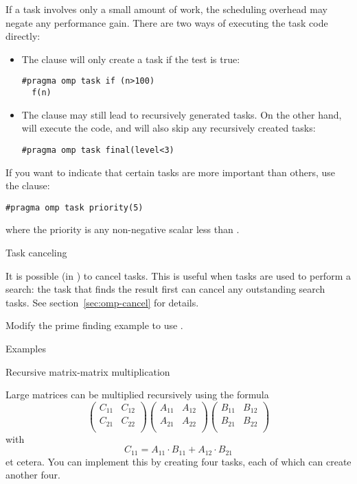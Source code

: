 If a task involves only a small amount of work,
the scheduling overhead may negate any performance gain.
There are two ways of executing the task code directly:
\begin{itemize}
\item The  clause will only create a task
  if the test is true:
\begin{lstlisting}
#pragma omp task if (n>100)
  f(n)
\end{lstlisting}
\item The  clause may still lead to recursively
  generated tasks. On the other hand, 
  will execute the code, and will also skip any recursively created tasks:
\begin{lstlisting}
#pragma omp task final(level<3)
\end{lstlisting}
\end{itemize}

If you want to indicate that certain tasks are more important
than others, use the  clause:
\begin{lstlisting}
#pragma omp task priority(5)
\end{lstlisting}
where the priority is any non-negative scalar
less than .

 {Task canceling}

It is possible (in ) to cancel
tasks. This is useful when tasks are used to perform a search: the
task that finds the result first can cancel any outstanding search
tasks.
See section~\ref{sec:omp-cancel} for details.

\begin{exercise}
  Modify the prime finding example to use .
\end{exercise}

 {Examples}

 {Recursive matrix-matrix multiplication}

Large matrices can be multiplied recursively using the formula
\[ 
\begin{pmatrix}
  C_{11}&C_{12}\\ C_{21}&C_{22}\\
\end{pmatrix}
\begin{pmatrix}
  A_{11}&A_{12}\\ A_{21}&A_{22}\\
\end{pmatrix}
\begin{pmatrix}
  B_{11}&B_{12}\\ B_{21}&B_{22}\\
\end{pmatrix}
\]
with
\[ C_{11} = A_{11}\cdot B_{11} + A_{12}\cdot B_{21} \]
et cetera.
You can implement this by creating four tasks, each of which can create another four.

